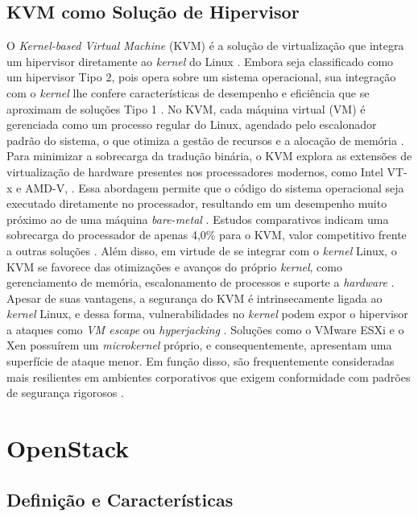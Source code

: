 \subsection{KVM como Solução de Hipervisor}

O \textit{Kernel-based Virtual Machine} (KVM) é a solução de virtualização que integra um hipervisor diretamente ao \textit{kernel} do Linux \cite{carissimi2008}. Embora seja classificado como um hipervisor Tipo 2, pois opera sobre um sistema operacional, sua integração com o \textit{kernel} lhe confere características de desempenho e eficiência que se aproximam de soluções Tipo 1 \cite{chawla2025, kominos2017}. No KVM, cada máquina virtual (VM) é gerenciada como um processo regular do Linux, agendado pelo escalonador padrão do sistema, o que otimiza a gestão de recursos e a alocação de memória \cite{anand2013}.
Para minimizar a sobrecarga da tradução binária, o KVM explora as extensões de virtualização de hardware presentes nos processadores modernos, como Intel VT-x e AMD-V, \cite{chawla2025, carissimi2008}. Essa abordagem permite que o código do sistema operacional seja executado diretamente no processador, resultando em um desempenho muito próximo ao de uma máquina \textit{bare-metal} \cite{kominos2017}. Estudos comparativos indicam uma sobrecarga do processador de apenas 4,0\% para o KVM, valor competitivo frente a outras soluções \cite{chawla2025}. Além disso, em virtude de se integrar com o \textit{kernel} Linux, o KVM se favorece das otimizações e avanços do próprio \textit{kernel}, como gerenciamento de memória, escalonamento de processos e suporte a \textit{hardware} \cite{anand2013, arora2014}. 
Apesar de suas vantagens, a segurança do KVM é intrinsecamente ligada ao \textit{kernel} Linux, e dessa forma, vulnerabilidades no \textit{kernel} podem expor o hipervisor a ataques como \textit{VM escape} ou \textit{hyperjacking} \cite{chawla2025}. Soluções como o VMware ESXi e o Xen possuírem um \textit{microkernel} próprio, e consequentemente, apresentam uma superfície de ataque menor. Em função disso, são frequentemente consideradas mais resilientes em ambientes corporativos que exigem conformidade com padrões de segurança rigorosos \cite{chawla2025}.

\section{OpenStack}

\label{sec:openstack}

\subsection{Definição e Características}

